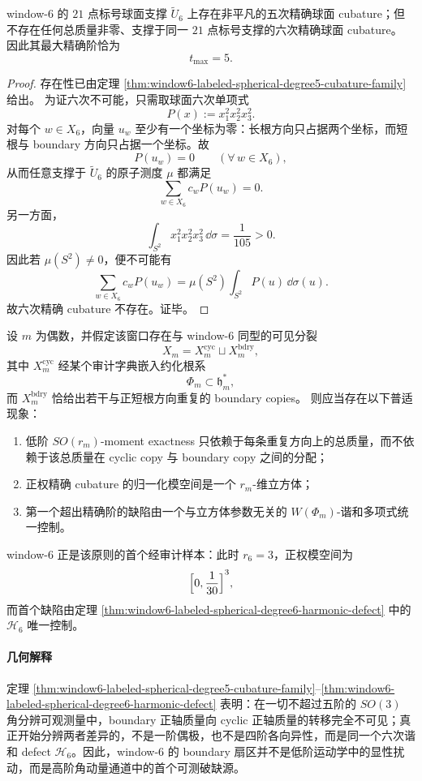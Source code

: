 \begin{corollary}\label{cor:window6-labeled-spherical-cubature-strength-five}
window-\(6\) 的 \(21\) 点标号球面支撑 \(\widetilde U_6\) 上存在非平凡的五次精确球面 cubature；但不存在任何总质量非零、支撑于同一 \(21\) 点标号支撑的六次精确球面 cubature。
因此其最大精确阶恰为
\[
t_{\max}=5.
\]
\end{corollary}
\begin{proof}
存在性已由定理 \ref{thm:window6-labeled-spherical-degree5-cubature-family} 给出。
为证六次不可能，只需取球面六次单项式
\[
P(x):=x_1^2x_2^2x_3^2.
\]
对每个 \(w\in X_6\)，向量 \(u_w\) 至少有一个坐标为零：长根方向只占据两个坐标，而短根与 boundary 方向只占据一个坐标。故
\[
P(u_w)=0
\qquad(\forall\,w\in X_6),
\]
从而任意支撑于 \(\widetilde U_6\) 的原子测度 \(\mu\) 都满足
\[
\sum_{w\in X_6}c_w P(u_w)=0.
\]
另一方面，
\[
\int_{S^2}x_1^2x_2^2x_3^2\,\dd\sigma=\frac{1}{105}>0.
\]
因此若 \(\mu(S^2)\ne 0\)，便不可能有
\[
\sum_{w\in X_6}c_w P(u_w)=\mu(S^2)\int_{S^2}P(u)\,\dd\sigma(u).
\]
故六次精确 cubature 不存在。证毕。
\end{proof}

\begin{conjecture}\label{conj:window-even-boundary-duplicate-spherical-cubature}
设 \(m\) 为偶数，并假定该窗口存在与 window-\(6\) 同型的可见分裂
\[
X_m=X_m^{\mathrm{cyc}}\sqcup X_m^{\mathrm{bdry}},
\]
其中 \(X_m^{\mathrm{cyc}}\) 经某个审计字典嵌入约化根系
\[
\Phi_m\subset \mathfrak h_m^\ast,
\]
而 \(X_m^{\mathrm{bdry}}\) 恰给出若干与正短根方向重复的 boundary copies。
则应当存在以下普适现象：
\begin{enumerate}
  \item 低阶 \(SO(r_m)\)-moment exactness 只依赖于每条重复方向上的总质量，而不依赖于该总质量在 cyclic copy 与 boundary copy 之间的分配；
  \item 正权精确 cubature 的归一化模空间是一个 \(r_m\)-维立方体；
  \item 第一个超出精确阶的缺陷由一个与立方体参数无关的 \(W(\Phi_m)\)-谐和多项式统一控制。
\end{enumerate}
window-\(6\) 正是该原则的首个经审计样本：此时 \(r_6=3\)，正权模空间为
\[
{\Bigl[0,\frac{1}{30}\Bigr]}^{3},
\]
而首个缺陷由定理 \ref{thm:window6-labeled-spherical-degree6-harmonic-defect} 中的 \(\mathscr H_6\) 唯一控制。
\end{conjecture}

\paragraph{几何解释}
定理 \ref{thm:window6-labeled-spherical-degree5-cubature-family}--\ref{thm:window6-labeled-spherical-degree6-harmonic-defect} 表明：在一切不超过五阶的 \(SO(3)\) 角分辨可观测量中，boundary 正轴质量向 cyclic 正轴质量的转移完全不可见；真正开始分辨两者差异的，不是一阶偶极，也不是四阶各向异性，而是同一个六次谐和 defect \(\mathscr H_6\)。因此，window-\(6\) 的 boundary 扇区并不是低阶运动学中的显性扰动，而是高阶角动量通道中的首个可测破缺源。
